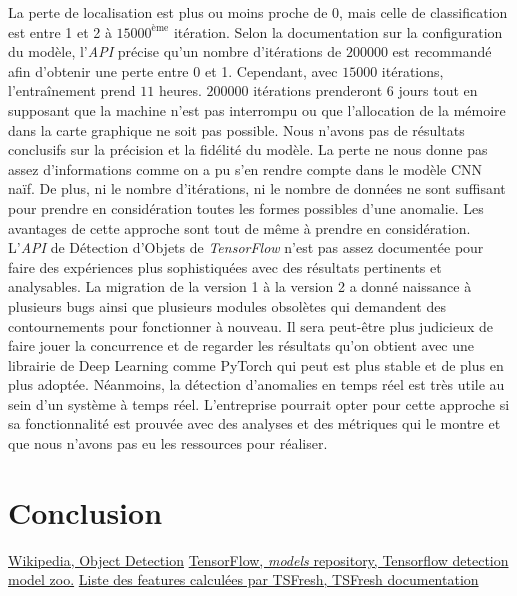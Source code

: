 \documentclass[french]{article}
\theoremstyle{mytheoremstyle}
\theoremstyle{mytheoremstyle}
\theoremstyle{myproblemstyle}
\begin{document}
    
    La perte de localisation est plus ou moins proche de 0, mais celle de classification est entre 1 et 2 à $15000^{\text{ème}}$ itération. Selon la documentation sur la configuration du modèle, l'\emph{API} précise qu'un nombre d'itérations de $200000$ est recommandé afin d'obtenir une perte entre 0 et 1. Cependant, avec $15000$ itérations, l'entraînement prend $11$ heures. $200000$ itérations prenderont $6$ jours tout en supposant que la machine n'est pas interrompu ou que l'allocation de la mémoire dans la carte graphique ne soit pas possible.
    \newline
    \indent Nous n'avons pas de résultats conclusifs sur la précision et la fidélité du modèle. La perte ne nous donne pas assez d'informations comme on a pu s'en rendre compte dans le modèle CNN naïf. De plus, ni le nombre d'itérations, ni le nombre de données ne sont suffisant pour prendre en considération toutes les formes possibles d'une anomalie. Les avantages de cette approche sont tout de même à prendre en considération. L'\emph{API} de Détection d'Objets de \textit{TensorFlow} n'est pas assez documentée pour faire des expériences plus sophistiquées avec des résultats pertinents et analysables. La migration de la version 1 à la version 2 a donné naissance à plusieurs bugs ainsi que plusieurs modules obsolètes qui demandent des contournements pour fonctionner à nouveau. Il sera peut-être plus judicieux de faire jouer la concurrence et de regarder les résultats qu'on obtient avec une librairie de Deep Learning comme PyTorch qui peut est plus stable et de plus en plus adoptée.
    \newline
    \indent Néanmoins, la détection d'anomalies en temps réel est très utile au sein d'un système à temps réel. L'entreprise pourrait opter pour cette approche si sa fonctionnalité est prouvée avec des analyses et des métriques qui le montre et que nous n'avons pas eu les ressources pour réaliser.
    \section{Conclusion}

\renewcommand\refname{7\indent Références}
\begin{thebibliography}{1}
 \href{https://en.wikipedia.org/wiki/Object\_detection}{Wikipedia, Object Detection}
 \href{https://github.com/tensorflow/models/blob/master/research/object_detection/g3doc/detection_model_zoo.md#coco-trained-models}{TensorFlow, \textit{models} repository, Tensorflow detection model zoo.}
 \href{https://tsfresh.readthedocs.io/en/latest/text/list_of_features.html}{Liste des features calculées par TSFresh, TSFresh documentation}
\end{thebibliography}
\clearpage
\end{document}
